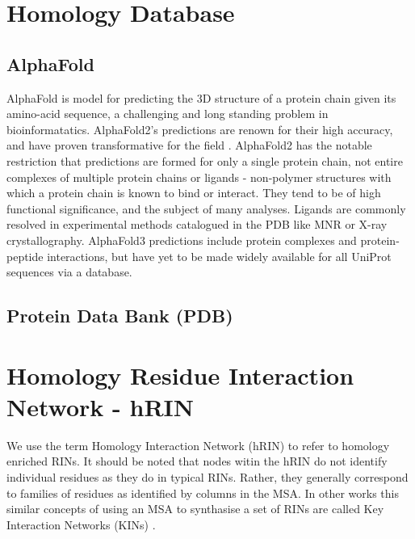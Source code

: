 \section{Homology Database}
\label{sec:DB-survey}
\subsection{AlphaFold}
AlphaFold is model for predicting the 3D structure of a protein chain given its amino-acid sequence, a challenging and long standing problem in bioinformatatics. AlphaFold2's predictions are renown for their high accuracy, and have proven transformative for the field \cite{alphafold}. 
AlphaFold2 has the notable restriction that predictions are formed for only a single protein chain, not entire complexes of multiple protein chains or ligands - non-polymer structures with which a protein chain is known to bind or interact.  They tend to be of high functional significance, and the subject of many analyses. Ligands are commonly resolved in experimental methods catalogued in the PDB like MNR or X-ray crystallography.
AlphaFold3 predictions include protein complexes and protein-peptide interactions, but have yet to be made widely available for all UniProt sequences via a database.

\subsection{Protein Data Bank (PDB)}

\section{Homology Residue Interaction Network - hRIN}
\label{sec:hRIN}
We use the term Homology Interaction Network (hRIN) to refer to homology enriched RINs.
It should be noted that nodes witin the hRIN do not identify individual residues as they do in typical RINs. Rather, they generally correspond to families of residues as identified by columns in the MSA. In other works this similar concepts of using an MSA to synthasise a set of RINs are called Key Interaction Networks (KINs) \cite{Yehorova2024}. 
